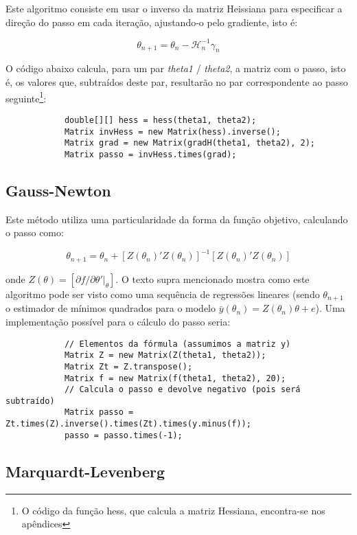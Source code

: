 \documentclass{abnt}
\newenvironment{mylisting}
{\begin{list}{}{\setlength{\leftmargin}{1em}}\item\scriptsize\bfseries}
{\end{list}}
\begin{document}
Este algoritmo consiste em usar o inverso da matriz Heissiana para especificar a direção do passo em cada iteração, ajustando-o pelo gradiente, isto é:

\[ \theta_{n+1} = \theta_{n} - \mathcal{H}_{n}^{-1}\gamma_{n} \]

O código abaixo calcula, para um par \textit{theta1} / \textit{theta2}, a matriz com o passo, isto é, os valores que, subtraídos deste par, resultarão no par correspondente ao passo seguinte\footnote{O código da função hess, que calcula a matriz Hessiana, encontra-se nos apêndices}:

\begin{mylisting}
\begin{verbatim}
			double[][] hess = hess(theta1, theta2);
			Matrix invHess = new Matrix(hess).inverse();
			Matrix grad = new Matrix(gradH(theta1, theta2), 2);
			Matrix passo = invHess.times(grad);
\end{verbatim}
\end{mylisting}

\subsection{Gauss-Newton}

Este método utiliza uma particularidade da forma da função objetivo, calculando o passo como:

\[ \theta_{n+1} = \theta_{n} + [Z(\theta_n)'Z(\theta_n)]^{-1}[Z(\theta_n)'Z(\theta_n)] \]

onde $Z(\theta)=[\partial f/ \partial \theta'\vert_{\theta}]$. O texto supra mencionado mostra como este algoritmo pode ser visto como uma sequência de regressões lineares (sendo $\theta_{n+1}$ o estimador de mínimos quadrados para o modelo $\bar y(\theta_{n})=Z(\theta_{n})\theta + e$). Uma implementação possível para o cálculo do passo seria:

\begin{mylisting}
\begin{verbatim}
			// Elementos da fórmula (assumimos a matriz y)
			Matrix Z = new Matrix(Z(theta1, theta2));
			Matrix Zt = Z.transpose();
			Matrix f = new Matrix(f(theta1, theta2), 20);
			// Calcula o passo e devolve negativo (pois será subtraído)
			Matrix passo = Zt.times(Z).inverse().times(Zt).times(y.minus(f));
			passo = passo.times(-1);
\end{verbatim}
\end{mylisting}

\subsection{Marquardt-Levenberg}
\end{document}
